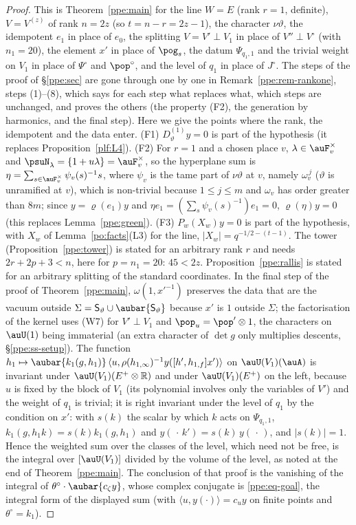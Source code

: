 \documentclass[10pt]{amsart}
\theoremstyle{definition}
\theoremstyle{remark}
\newcommand{\R}{\mathbb R}
\begin{document}
\begin{proof}
This is Theorem~\ref{ppe:main} for the line $W=E$ (rank $r=1$, definite), $V=V^{(z)}$ of rank $n=2z$
(so $t=n-r=2z-1$), the character $\nu\vartheta$, the idempotent $e_1$ in place of $e_0$, the splitting
$V=V'\perp V_1$ in place of $V''\perp V^\circ$ (with $n_1=20$), the element $x'$ in place of $\pog_s$, the
datum $\Psi_{q_1,1}$ and the trivial weight on $V_1$ in place of $\Psi^\circ$ and $\pop^\circ$, and the
level of $q_1$ in place of $J^\circ$. The steps of the proof of \S\ref{ppe:sec} are gone through one by
one in Remark~\ref{ppe:rem-rankone}, steps (1)--(8), which says for each step what replaces what, which
steps are unchanged, and proves the others (the property (F2), the generation by harmonics, and the
final step). Here we give the points where the rank, the idempotent and the data enter.
(F1) $D^{(1)}_\vartheta y=0$ is part of the hypothesis (it replaces Proposition~\ref{plf:L4}).
(F2) For $r=1$ and a chosen place $v$, $\lambda\in\auF_v^\times$ and $\psuN_\lambda=\{1+u\lambda\}=
\auF_v^\times$, so the hyperplane sum is $\eta=\sum_{s\in\auF_v^\times}\psi_v(s)^{-1}s$, where $\psi_v$ is
the tame part of $\nu\vartheta$ at $v$, namely $\omega_v^{\,j}$ ($\vartheta$ is unramified at $v$),
which is non-trivial because $1\le j\le m$ and $\omega_v$ has order greater than $8m$; since $y=\varrho
(e_1)y$ and $\eta e_1=(\sum_s\psi_v(s)^{-1})e_1=0$, $\varrho(\eta)y=0$ (this replaces
Lemma~\ref{ppe:green}). (F3) $P_w(X_w)y=0$ is part of the hypothesis, with $X_w$ of
Lemma~\ref{po:facts}(L3) for the line, $|X_w|=q^{-1/2-(t-1)}$. The tower
(Proposition~\ref{ppe:tower}) is stated for an arbitrary rank $r$ and needs $2r+2p+3<n$, here for
$p=n_1=20$: $45<2z$. Proposition~\ref{ppe:rallis} is stated for an arbitrary splitting of the standard
coordinates. In the final step of the proof of Theorem~\ref{ppe:main}, $\omega(1,x'^{-1})$ preserves
the data that are the vacuum outside $\Sigma=\mathsf S_\vartheta\cup\aubar{\mathsf S_\vartheta}$ because $x'$
is $1$ outside $\Sigma$; the factorisation of the kernel uses (W7) for $V'\perp V_1$ and
$\pop_u=\pop'\otimes1$, the characters on $\auU(1)$ being immaterial (an extra character of $\det g$ only
multiplies descents, \S\ref{ppe:ss-setup}). The function $h_1\mapsto\aubar{k_1(g,h_1)}\,\langle u,
\rho(h_{1,\infty})^{-1}y([h',h_{1,f}]x')\rangle$ on $\auU(V_1)(\auA)$ is invariant under
$\auU(V_1)(E^+\otimes\R)$ and under $\auU(V_1)(E^+)$ on the left, because $u$ is fixed by the block of
$V_1$ (its polynomial involves only the variables of $V'$) and the weight of $q_1$ is trivial; it is
right invariant under the level of $q_1$ by the condition on $x'$: with $s(k)$ the scalar by which $k$
acts on $\Psi_{q_1,1}$, $k_1(g,h_1k)=s(k)k_1(g,h_1)$ and $y(\,\cdot\,k')=s(k)\,y(\,\cdot\,)$, and
$|s(k)|=1$. Hence the weighted sum over the classes of the level, which
need not be free, is the integral over $[\auU(V_1)]$ divided by the volume of the level, as noted at the end of
Theorem~\ref{ppe:main}. The conclusion of that proof is the vanishing of the integral of $\theta^\circ
\cdot\aubar{c_\zeta y}$, whose complex conjugate is \eqref{ppe:eq-goal}, the integral form of the
displayed sum (with $\langle u,y(\cdot)\rangle=c_u y$ on finite points and $\theta^\circ=k_1$).
\end{proof}
\end{document}
